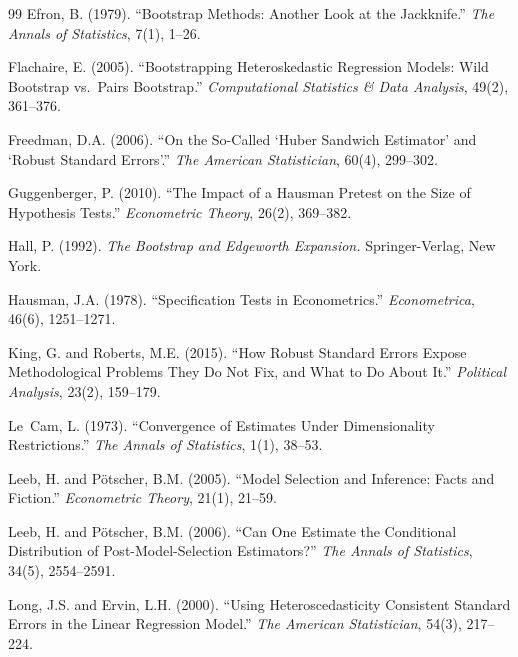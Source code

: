 \documentclass[12pt]{article}
\theoremstyle{definition}
\theoremstyle{remark}
\begin{document}
\begin{thebibliography}{99}
Efron, B. (1979).
\newblock ``Bootstrap Methods: Another Look at the Jackknife.''
\newblock \textit{The Annals of Statistics}, 7(1), 1--26.

Flachaire, E. (2005).
\newblock ``Bootstrapping Heteroskedastic Regression Models: Wild Bootstrap vs.\ Pairs Bootstrap.''
\newblock \textit{Computational Statistics \& Data Analysis}, 49(2), 361--376.

Freedman, D.A. (2006).
\newblock ``On the So-Called `Huber Sandwich Estimator' and `Robust Standard Errors'.''
\newblock \textit{The American Statistician}, 60(4), 299--302.

Guggenberger, P. (2010).
\newblock ``The Impact of a Hausman Pretest on the Size of Hypothesis Tests.''
\newblock \textit{Econometric Theory}, 26(2), 369--382.

Hall, P. (1992).
\newblock \textit{The Bootstrap and Edgeworth Expansion.}
\newblock Springer-Verlag, New York.

Hausman, J.A. (1978).
\newblock ``Specification Tests in Econometrics.''
\newblock \textit{Econometrica}, 46(6), 1251--1271.

King, G. and Roberts, M.E. (2015).
\newblock ``How Robust Standard Errors Expose Methodological Problems They Do Not Fix, and What to Do About It.''
\newblock \textit{Political Analysis}, 23(2), 159--179.

Le~Cam, L. (1973).
\newblock ``Convergence of Estimates Under Dimensionality Restrictions.''
\newblock \textit{The Annals of Statistics}, 1(1), 38--53.

Leeb, H. and P\"otscher, B.M. (2005).
\newblock ``Model Selection and Inference: Facts and Fiction.''
\newblock \textit{Econometric Theory}, 21(1), 21--59.

Leeb, H. and P\"otscher, B.M. (2006).
\newblock ``Can One Estimate the Conditional Distribution of Post-Model-Selection Estimators?''
\newblock \textit{The Annals of Statistics}, 34(5), 2554--2591.

Long, J.S. and Ervin, L.H. (2000).
\newblock ``Using Heteroscedasticity Consistent Standard Errors in the Linear Regression Model.''
\newblock \textit{The American Statistician}, 54(3), 217--224.


\end{thebibliography}
\end{document}

